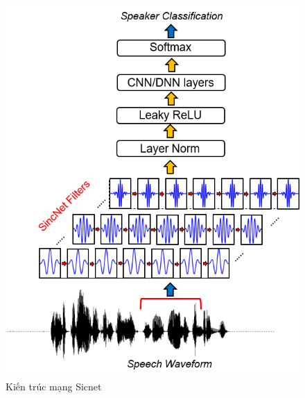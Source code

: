 \documentclass{article}
\begin{document}
	\begin{figure}[H]
		\centering
		\includegraphics[width=1\textwidth]{charts/SincNet.png}
		\caption{Kiến trúc mạng Sicnet}
		\label{fig:writing-thesis}
	\end{figure}
\end{document}
